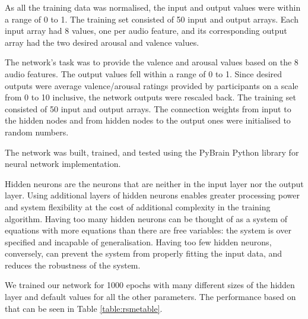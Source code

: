 As all the training data was normalised, the input and output values were within a range of 0 to 1. The training set consisted of 50 input and output arrays. Each input array had 8 values, one per audio feature, and its corresponding output array had the two desired arousal and valence values.

The network’s task was to provide the valence and arousal values based on the 8 audio features. The output values fell within a range of 0 to 1. Since desired outputs were average valence/arousal ratings provided by participants on a scale from 0 to 10 inclusive, the network outputs were rescaled back. The training set consisted of 50 input and output arrays. The connection weights from input to the hidden nodes and from hidden nodes to the output ones were initialised to random numbers. 

The network was built, trained, and tested using the PyBrain \cite{pybrain} Python library for neural network implementation. 

Hidden neurons are the neurons that are neither in the input layer nor the output layer. Using additional layers of hidden neurons enables greater processing power and system flexibility at the cost of additional complexity in the training algorithm. Having too many hidden neurons can be thought of as a system of equations with more equations than there are free variables: the system is over specified and incapable of generalisation. Having too few hidden neurons, conversely, can prevent the system from properly fitting the input data, and reduces the robustness of the system.

We trained our network for 1000 epochs with many different sizes of the hidden layer and default values for all the other parameters. The performance based on that can be seen in Table \ref{table:rsmetable}.


